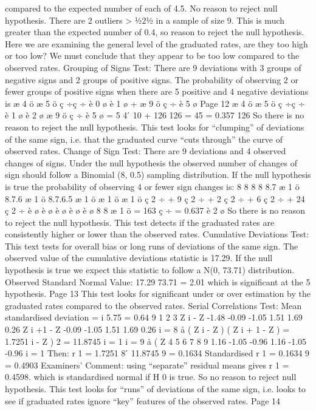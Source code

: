 \documentclass[a4paper,1pt]{article}
\begin{document}
compared to the expected number of each of 4.5. No reason to reject null
hypothesis.
There are 2 outliers > 1⁄221⁄2 in a sample of size 9. This is much greater
than the expected number of 0.4, so reason to reject the null hypothesis.
Here we are examining the general level of the graduated rates, are they
too high or too low?
We must conclude that they appear to be too low compared to the
observed rates.
Grouping of Signs Test:
There are 9 deviations with 3 groups of negative signs and 2 groups of
positive signs.
The probability of observing 2 or fewer groups of positive signs when there
are 5 positive and 4 negative deviations is
æ 4 ö æ 5 ö
ç ÷ç ÷
è 0 ø è 1 ø +
æ 9 ö
ç ÷
è 5 ø
Page 12
æ 4 ö æ 5 ö
ç ÷ç ÷
è 1 ø è 2 ø
æ 9 ö
ç ÷
è 5 ø %
= 5
4  ́ 10
+
126
126
= 45
= 0.357
126
So there is no reason to reject the null hypothesis.
This test looks for “clumping” of deviations of the same sign, i.e. that the
graduated curve “cuts through” the curve of observed rates.
Change of Sign Test:
There are 9 deviations and 4 observed changes of signs.
Under the null hypothesis the observed number of changes of sign should
follow a Binomial (8, 0.5) sampling distribution.
If the null hypothesis is true the probability of observing 4 or fewer sign
changes is:
8
8
8
8
8.7 æ 1 ö
8.7.6 æ 1 ö
8.7.6.5 æ 1 ö
æ 1 ö
æ 1 ö
ç 2 ÷ + 9 ç 2 ÷ + 2 ç 2 ÷ + 6 ç 2 ÷ + 24 ç 2 ÷
è ø
è ø
è ø
è ø
è ø
8
8
æ 1 ö
= 163 ç ÷ = 0.637
è 2 ø
So there is no reason to reject the null hypothesis.
This test detects if the graduated rates are consistently higher or lower
than the observed rates.
Cumulative Deviations Test:
This text tests for overall bias or long runs of deviations of the same sign.
The observed value of the cumulative deviations statistic is 17.29.
If the null hypothesis is true we expect this statistic to follow a
N(0, 73.71) distribution.
Observed Standard Normal Value:
17.29
73.71
= 2.01
which is significant at the 5%
hypothesis.
Page 13 %
This test looks for significant under or over estimation by the graduated
rates compared to the observed rates.
Serial Correlations Test:
Mean standardised deviation =
i
5.75
= 0.64
9
1 2 3 Z i - Z -1.48 -0.09 -1.05 1.51 1.69 0.26
Z i +1 - Z -0.09 -1.05 1.51 1.69 0.26
i = 8
å ( Z
i - Z ) ( Z i + 1 - Z ) = 1.7251
i - Z ) 2 = 11.8745
i = 1
i = 9
å ( Z
4
5
6
7 8 9
1.16 -1.05 -0.96
1.16 -1.05 -0.96
i = 1
Then: r 1 =
1.7251
8
 ́ 11.8745
9
= 0.1634
Standardised r 1 = 0.1634 9 = 0.4903
Examiners’ Comment: using “separate” residual means gives r 1 = 0.4598.
which is standardised normal if H 0 is true.
So no reason to reject null hypothesis.
This test looks for “runs” of deviations of the same sign, i.e. looks to see if
graduated rates ignore “key” features of the observed rates.
Page 14 %
\end{document}
